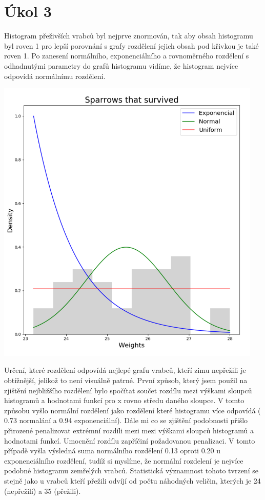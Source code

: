 \documentclass[12pt,a4paper]{article}
\begin{document}
\section{Úkol 3}
Histogram přeživších vrabců byl nejprve znormován, tak aby obsah histogramu byl roven 1 pro lepší porovnání s grafy rozdělení jejich obsah pod křivkou je také roven 1. Po zanesení normálního, exponenciálního a rovnoměrného rozdělení s odhadnutými parametry do grafů histogramu vidíme, že histogram nejvíce odpovídá normálnímu rozdělení.
\begin{center}
\includegraphics[width=5in]{3_survived}
\end{center}
\pagebreak
Určení, které rozdělení odpovídá nejlepé grafu vrabců, kteří zimu nepřežili je obtížnější, jelikož to není visuálně patrné. První způsob, který jsem použil na zjištění nejbližšího rozdělení bylo spočítat součet rozdílu mezi výškami sloupců histogramů a hodnotami funkcí pro x rovno středu daného sloupce. V tomto způsobu vyšlo normální rozdělení jako rozdělení které histogramu více odpovídá ( 0.73 normalání a 0.94 exponenciální). Dále mi co se zjištění podobnosti přišlo přirozené penalizovat extrémní rozdíli  mezi mezi výškami sloupců histogramů a hodnotami funkcí. Umocnění rozdílu zapříčiní požadovanou penalizaci. V tomto případě vyšla výsledná suma normálního rozdělení 0.13 oproti 0.20 u exponenciálního rozdělení, tudíž si myslíme, že normální rozdelení je nejvíce podobné histogramu zemřelých vrabců. Statistická významnost tohoto tvrzení se stejně jako u vrabců kteří přežili odvíjí od počtu náhodných veličin, kterých je 24 (nepřežili) a 35 (přežili).
\end{document}

